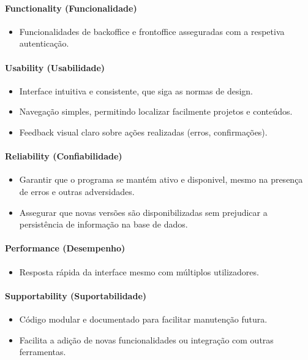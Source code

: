 \paragraph{Functionality (Funcionalidade)}
\begin{itemize}
    \item Funcionalidades de backoffice e frontoffice asseguradas com a respetiva autenticação.
\end{itemize}

\paragraph{Usability (Usabilidade)}
\begin{itemize}
    \item Interface intuitiva e consistente, que siga as normas de design.
    \item Navegação simples, permitindo localizar facilmente projetos e conteúdos.
    \item Feedback visual claro sobre ações realizadas (erros, confirmações).
\end{itemize}

\paragraph{Reliability (Confiabilidade)}
\begin{itemize}
    \item Garantir que o programa se mantém ativo e disponivel, mesmo na presença de erros e outras adversidades.
    \item Assegurar que novas versões são disponibilizadas sem prejudicar a persistência de informação na base de dados.
\end{itemize}

\paragraph{Performance (Desempenho)}
\begin{itemize}
    \item Resposta rápida da interface mesmo com múltiplos utilizadores.
\end{itemize}

\paragraph{Supportability (Suportabilidade)}
\begin{itemize}
    \item Código modular e documentado para facilitar manutenção futura.
    \item Facilita a adição de novas funcionalidades ou integração com outras ferramentas.
\end{itemize}


